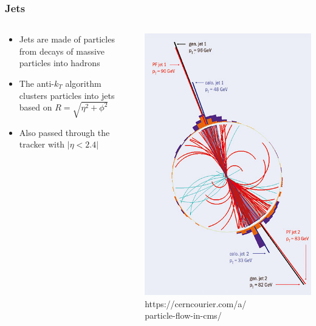 \documentclass{beamer}
\begin{document}
\begin{frame}
  \frametitle{Jets}

  \begin{columns}
    \begin{column}{0.7\linewidth}
      \begin{itemize}
      \item Jets are made of particles from decays of massive particles into hadrons
      \item The anti-$k_T$ algorithm clusters particles into jets based on
        $R = \sqrt{\eta^2 + \phi^2}$
      \item Also passed through the tracker with $|\eta < 2.4|$
      \end{itemize}
    \end{column}
    \begin{column}{0.3\linewidth}
      \includegraphics[width=\linewidth]{figures/CCrec1_05_16.jpg}
      \tiny{https://cerncourier.com/a/\\particle-flow-in-cms/}
    \end{column}
  \end{columns}


\end{frame}
\end{document}
